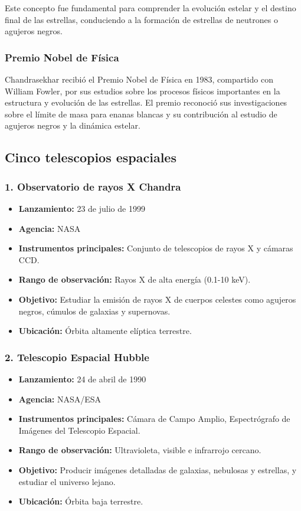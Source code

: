 \documentclass{article}
\begin{document}
Este concepto fue fundamental para comprender la evolución estelar y el destino final de las estrellas, conduciendo a la formación de estrellas de neutrones o agujeros negros.

\subsubsection*{Premio Nobel de Física}

Chandrasekhar recibió el Premio Nobel de Física en 1983, compartido con William Fowler, por sus estudios sobre los procesos físicos importantes en la estructura y evolución de las estrellas. El premio reconoció sus investigaciones sobre el límite de masa para enanas blancas y su contribución al estudio de agujeros negros y la dinámica estelar.

\subsection*{Cinco telescopios espaciales}

\subsubsection*{1. Observatorio de rayos X Chandra}
\begin{itemize}
    \item \textbf{Lanzamiento:} 23 de julio de 1999
    \item \textbf{Agencia:} NASA
    \item \textbf{Instrumentos principales:} Conjunto de telescopios de rayos X y cámaras CCD.
    \item \textbf{Rango de observación:} Rayos X de alta energía (0.1-10 keV).
    \item \textbf{Objetivo:} Estudiar la emisión de rayos X de cuerpos celestes como agujeros negros, cúmulos de galaxias y supernovas.
    \item \textbf{Ubicación:} Órbita altamente elíptica terrestre.
\end{itemize}

\subsubsection*{2. Telescopio Espacial Hubble}
\begin{itemize}
    \item \textbf{Lanzamiento:} 24 de abril de 1990
    \item \textbf{Agencia:} NASA/ESA
    \item \textbf{Instrumentos principales:} Cámara de Campo Amplio, Espectrógrafo de Imágenes del Telescopio Espacial.
    \item \textbf{Rango de observación:} Ultravioleta, visible e infrarrojo cercano.
    \item \textbf{Objetivo:} Producir imágenes detalladas de galaxias, nebulosas y estrellas, y estudiar el universo lejano.
    \item \textbf{Ubicación:} Órbita baja terrestre.
\end{itemize}
\end{document}
